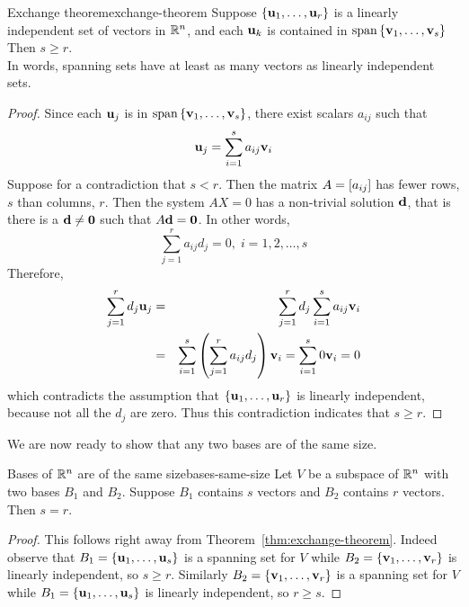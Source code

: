 \begin{theorem}{Exchange theorem}{exchange-theorem}
  Suppose $\left\{\mbox{\bf u}_{1},\ldots ,\mbox{\bf u}_{r}\right\} $ is a linearly
  independent set of vectors in $\mathbb{R}^n$, and each $\mbox{\bf u}_{k}$ is
  contained in $\sspan\set{\vect{v}_{1},\ldots
    ,\vect{v}_{s}}$ Then $s\geq r$. \\
  In words, spanning sets have at least as
  many vectors as linearly independent sets.
\end{theorem}

\begin{proof}
  Since each $\mbox{\bf u}_j$ is in
  $\sspan\set{\vect{v}_{1},\ldots ,\vect{v}_{s}} $, there exist
  scalars $a_{ij}$ such that
  \begin{equation*}
    \mbox{\bf u}_{j}=\sum_{i=1}^{s}a_{ij}\mbox{\bf v}_{i}
  \end{equation*}
  Suppose for a contradiction that $s<r$. Then the matrix
  $A = \left[ a_{ij} \right]$ has fewer rows, $s$ than columns, $r$. Then the
  system $AX=0$ has %
  a non-trivial solution $\mbox{\bf d}$, that is there is a
  $\mbox{\bf d}\neq \mbox{\bf 0}$ such that $A\mbox{\bf d}=\mbox{\bf 0}$. In other
  words,
  \begin{equation*}
    \sum_{j=1}^{r}a_{ij}d_{j}=0,\;i=1,2,\ldots ,s
  \end{equation*}
  Therefore, 
  \begin{eqnarray*}
    \sum_{j=1}^{r}d_{j}\mbox{\bf u}_{j}
    &=&\sum_{j=1}^{r}d_{j}\sum_{i=1}^{s}a_{ij}
        \mbox{\bf v}_{i} \\
    &=&\sum_{i=1}^{s}\left(\sum_{j=1}^{r}a_{ij}d_{j}\right) \mbox{\bf v}
        _{i}=\sum_{i=1}^{s}0\mbox{\bf v}_{i}=0
  \end{eqnarray*}
  which contradicts the assumption that
  $\left\{\mbox{\bf u}_{1},\ldots ,\mbox{\bf u}_{r}\right\} $ is linearly independent,
  because not all the $d_{j}$ are zero. Thus this contradiction
  indicates that $s\geq r$.
\end{proof}

We are now ready to show that any two bases are of the same size.

\begin{theorem}{Bases of\/ $\mathbb{R}^{n}$ are of the same size}{bases-same-size}
  Let $V$ be a subspace of\/ $\mathbb{R}^{n}$ with two bases $B_1$ and
  $B_2$. Suppose $B_1$ contains $s$ vectors and $B_2$ contains $r$
  vectors. Then $s=r$.
\end{theorem}

\begin{proof}
  This follows right away from
  Theorem~\ref{thm:exchange-theorem}. Indeed observe that
  $B_1 = \left\{ \mbox{\bf u}_{1},\ldots ,\mbox{\bf u}_{s}\right\} $ is a spanning set
  for $V$ while $ B_2 = \left\{\mbox{\bf v}_{1},\ldots ,\mbox{\bf v}_{r}\right\} $ is
  linearly independent, so $s \geq r$. Similarly
  $B_2 = \left\{\mbox{\bf v}_{1},\ldots ,\mbox{\bf v} _{r}\right\} $ is a spanning set
  for $V$ while $B_1 = \left\{\mbox{\bf u}_{1},\ldots , \mbox{\bf u}_{s}\right\} $ is
  linearly independent, so $r\geq s$.
\end{proof}

